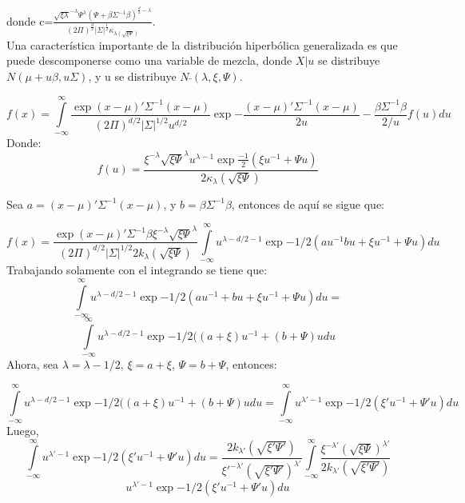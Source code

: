 \documentclass[11pt]{book}
\begin{document}
donde c=$\frac{\sqrt{\xi\lambda}^{-\lambda}\Psi^{\lambda}(\Psi+\beta\acute{} \Sigma^{-1}\beta)^{\frac{d}{2}-\lambda}}{(2\Pi)^{\frac{d}{2}}|\Sigma|^{\frac{1}{2}}\kappa_{\lambda(\sqrt{\xi\Psi})}}$. \\


Una característica importante de la distribución hiperbólica generalizada es que puede descomponerse como una variable de mezcla, donde $X|u$ se distribuye $N(\mu+u\beta,u\Sigma)$, y u se distribuye $N\bar{}(\lambda,\xi,\Psi)$.

\begin{equation*}
f(x)=\underset{-\infty }{\overset{\infty }{\int }}\frac{\exp{(x-\mu)'\Sigma^{-1}(x-\mu)}}{(2\Pi)^{d/2}|\Sigma|^{1/2}u^{d/2}}\exp{-\dfrac{(x-\mu)'\Sigma^{-1}(x-\mu)}{2u}}-\frac{\beta\Sigma^{-1}\beta}{2/u}f(u)du
\end{equation*}
Donde:
\begin{equation*}
f(u)=\dfrac{\xi^{-\lambda}\sqrt{\xi\Psi}^{\lambda}u^{\lambda-1}\exp{\frac{-1}{2}(\xi u^{-1} + \Psi u)}}{2\kappa_{\lambda}(\sqrt{\xi\Psi})} 
\end{equation*}

Sea $a=(x-\mu)'\Sigma^{-1}(x-\mu)$, y $b=\beta\Sigma^{-1}\beta$, entonces de aquí se sigue que:

\begin{equation*}
f(x)=\frac{\exp{(x-\mu)'\Sigma^{-1}\beta}\xi^{-\lambda}\sqrt{\xi\Psi}^{\lambda}}{(2\Pi)^{d/2}|\Sigma|^{1/2}2k_{\lambda}(\sqrt{\xi\Psi})}\underset{-\infty }{\overset{\infty }{\int }}u^{\lambda - d/2 -1}\exp{-1/2(au^{-1}bu+\xi u^{-1}+\Psi u)}du
\end{equation*}
Trabajando solamente con el integrando se tiene que:
\begin{equation*}
\underset{-\infty }{\overset{\infty }{\int }}u^{\lambda - d/2 -1}\exp{-1/2(au^{-1}+bu+\xi u^{-1}+\Psi u)}du=
\end{equation*}
\begin{equation*}
\underset{-\infty }{\overset{\infty }{\int }}u^{\lambda -d/2 -1}\exp{-1/2((a+\xi)u^{-1}+(b+\Psi)u} du
\end{equation*}
Ahora, sea $\lambda\acute{}=\lambda- 1/2$, $\xi\acute{}=a+\xi$, $\Psi\acute{}=b+\Psi$, entonces:

\begin{equation*}
\underset{-\infty }{\overset{\infty }{\int }}u^{\lambda -d/2 -1}\exp{-1/2((a+\xi)u^{-1}+(b+\Psi)u} du=\underset{-\infty }{\overset{\infty }{\int }}u^{\lambda'-1}\exp{-1/2(\xi' u^{-1}+ \Psi'u)} du
\end{equation*}
Luego,
\begin{equation*}
\underset{-\infty }{\overset{\infty }{\int }}u^{\lambda'-1}\exp{-1/2(\xi' u^{-1}+ \Psi'u)} du=     \frac{2k_{\lambda'}(\sqrt{\xi'\Psi'})}{\xi'^{-\lambda'}(\sqrt{\xi'\Psi'})^{\lambda'}}   \underset{-\infty }{\overset{\infty }{\int }}\frac{\xi^{-\lambda'}(\sqrt{\xi\Psi})^{\lambda'}}{2k_{\lambda'}(\sqrt{\xi'\Psi'})}
\end{equation*}
\begin{equation*}
u^{\lambda'-1}\exp{-1/2(\xi' u^{-1}+ \Psi'u)} du
\end{equation*}
\end{document}
